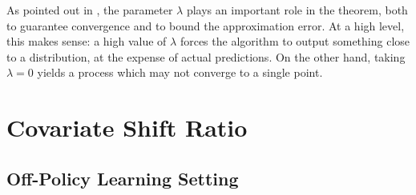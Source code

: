 \documentclass[12pt,a4paper,openright,twoside]{article}
\DeclareMathOperator*{\Sspace}{\mathcal{S}}
\DeclareMathOperator*{\T}{\mathcal{T}}
\numberwithin{equation}{section}
\theoremstyle{definition}
\theoremstyle{remark}
\theoremstyle{plain}
\begin{document}
As pointed out in \cite{DRLlinear}, the parameter $\lambda$ plays an important role in the theorem, both to guarantee convergence and to bound the approximation error. At a high level, this makes sense: a high value of $\lambda$ forces the algorithm to output something close to a distribution, at the expense of actual predictions. On the other hand, taking $\lambda=0$ yields a process which may not converge to a single point.
 

\newpage


\thispagestyle{plain}

\thispagestyle{plain}
\section{Covariate Shift Ratio}




\subsection{Off-Policy Learning Setting} \label{offpolicySetting}
\end{document}
